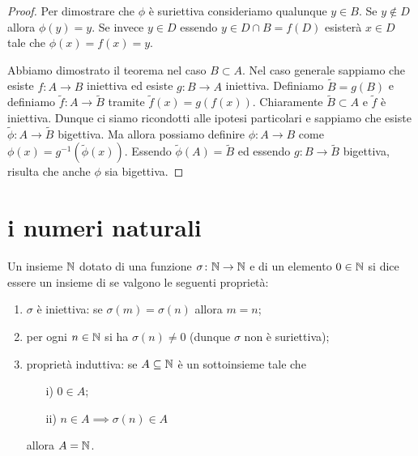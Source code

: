 \begin{proof}
Per dimostrare che $\phi$ è suriettiva consideriamo qualunque $y \in B$.
Se $y\not \in D$ allora $\phi(y)=y$.
Se invece $y\in D$ essendo $y\in D\cap B = f(D)$ esisterà $x\in D$ tale
che $\phi(x) = f(x) = y$.

Abbiamo dimostrato il teorema nel caso $B\subset A$.
Nel caso generale sappiamo che esiste $f\colon A\to B$ iniettiva
ed esiste $g\colon B\to A$ iniettiva. Definiamo $\tilde B=g(B)$ e
definiamo $\tilde f\colon A\to \tilde B$ tramite $\tilde f(x) = g(f(x))$.
Chiaramente $\tilde B\subset A$ e $\tilde f$ è iniettiva.
Dunque ci siamo ricondotti alle ipotesi particolari e sappiamo che esiste
$\tilde \phi \colon A \to \tilde B$ bigettiva. Ma allora possiamo definire
$\phi\colon A\to B$ come $\phi(x) = g^{-1}(\tilde \phi(x))$.
Essendo $\tilde \phi(A)=\tilde B$ ed essendo $g\colon B\to \tilde B$
bigettiva, risulta che anche $\phi$ sia bigettiva.
\end{proof}

\section{i numeri naturali}

%    
\begin{definition}%
  \label{def:naturali}%
  \index{$\NN$}%
  Un insieme $\NN$ dotato di una 
  funzione $\sigma\colon{\mathbb N}\to{\mathbb N}$ e di un elemento $0\in {\mathbb N}$ 
  si dice essere un insieme di 
   se valgono le seguenti proprietà:
  \begin{enumerate}
  \item $\sigma$ è iniettiva: se $\sigma(m) =\sigma(n)$ allora $m=n$;
  \item per ogni $n\in {\mathbb N}$ si ha $\sigma(n)\neq 0$
  (dunque $\sigma$ non è suriettiva);
  \item proprietà induttiva: 
  se $A\subseteq {\mathbb N}$ è un sottoinsieme tale che 
  \begin{enumerate}
    \item[i)] $0\in A$;
    \item[ii)] $n\in A \implies \sigma(n)\in A$
  \end{enumerate}
  allora $A={\mathbb N}$.
\end{enumerate}
\end{definition}

